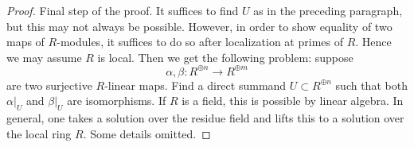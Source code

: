 \documentclass[10pt,a4paper]{amsart}
\theoremstyle{plain}
\theoremstyle{definition}
\theoremstyle{remark}
\numberwithin{equation}{subsection}
\begin{document}
\begin{proof}
\medskip\noindent
Final step of the proof. It suffices to find $U$ as in the 
preceding paragraph, but this may not always be possible. However,
in order to show equality of two maps of $R$-modules, it suffices
to do so after localization at primes of $R$. Hence we may assume
$R$ is local. Then we get the following problem: suppose
$$
\alpha, \beta : R^{\oplus n} \longrightarrow R^{\oplus m}
$$
are two surjective $R$-linear maps. Find a direct summand
$U \subset R^{\oplus n}$ such that both $\alpha|_U$ and $\beta|_U$
are isomorphisms. If $R$ is a field, this is possible by linear algebra.
In general, one takes a solution over the residue field and lifts this
to a solution over the local ring $R$. Some details omitted.
\end{proof}
\end{document}
